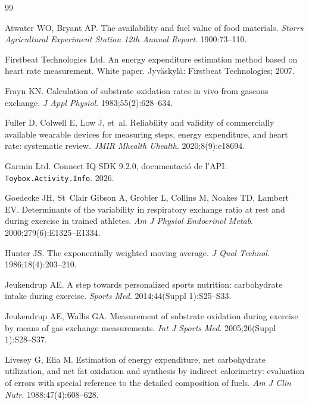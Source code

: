 \documentclass[10pt,a4paper]{article}
\begin{document}
\begin{thebibliography}{99}
\small

Atwater WO, Bryant AP.
\newblock The availability and fuel value of food materials.
\newblock \emph{Storrs Agricultural Experiment Station 12th Annual Report}. 1900:73--110.

Firstbeat Technologies Ltd.
\newblock An energy expenditure estimation method based on heart rate measurement.
\newblock White paper. Jyväskylä: Firstbeat Technologies; 2007.

Frayn KN.
\newblock Calculation of substrate oxidation rates in vivo from gaseous exchange.
\newblock \emph{J Appl Physiol}. 1983;55(2):628--634.

Fuller D, Colwell E, Low J, et~al.
\newblock Reliability and validity of commercially available wearable devices for
  measuring steps, energy expenditure, and heart rate: systematic review.
\newblock \emph{JMIR Mhealth Uhealth}. 2020;8(9):e18694.

Garmin Ltd.
\newblock Connect IQ SDK 9.2.0, documentació de l'API: \texttt{Toybox.Activity.Info}.
  2026.

Goedecke JH, St~Clair Gibson A, Grobler L, Collins M, Noakes TD, Lambert EV.
\newblock Determinants of the variability in respiratory exchange ratio at rest and during
  exercise in trained athletes.
\newblock \emph{Am J Physiol Endocrinol Metab}. 2000;279(6):E1325--E1334.

Hunter JS.
\newblock The exponentially weighted moving average.
\newblock \emph{J Qual Technol}. 1986;18(4):203--210.


Jeukendrup AE.
\newblock A step towards personalized sports nutrition: carbohydrate intake during
  exercise.
\newblock \emph{Sports Med}. 2014;44(Suppl 1):S25--S33.

Jeukendrup AE, Wallis GA.
\newblock Measurement of substrate oxidation during exercise by means of gas
  exchange measurements.
\newblock \emph{Int J Sports Med}. 2005;26(Suppl 1):S28--S37.

Livesey G, Elia M.
\newblock Estimation of energy expenditure, net carbohydrate utilization, and net fat
  oxidation and synthesis by indirect calorimetry: evaluation of errors with special
  reference to the detailed composition of fuels.
\newblock \emph{Am J Clin Nutr}. 1988;47(4):608--628.


\end{thebibliography}
\end{document}
